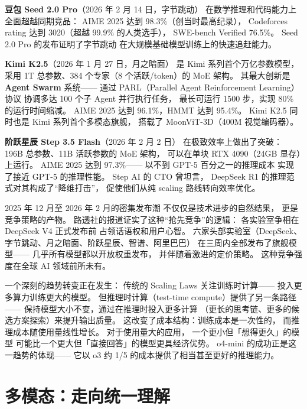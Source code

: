 \textbf{豆包 Seed 2.0 Pro}（2026 年 2 月 14 日，字节跳动）
在数学推理和代码能力上全面超越同期竞品：
AIME 2025 达到 98.3\%（创当时最高纪录），
Codeforces rating 达到 3020（超越 99.9\% 的人类选手），
SWE-bench Verified 76.5\%。
Seed 2.0 Pro 的发布证明了字节跳动
在大规模基础模型训练上的快速追赶能力。

\textbf{Kimi K2.5}（2026 年 1 月 27 日，月之暗面）
是 Kimi 系列首个万亿参数模型，
采用 1T 总参数、384 个专家（8 个活跃/token）的 MoE 架构。
其最大创新是 \textbf{Agent Swarm} 系统——
通过 PARL（Parallel Agent Reinforcement Learning）协议
协调多达 100 个子 Agent 并行执行任务，
最长可运行 1500 步，实现 80\% 的运行时间缩减。
AIME 2025 达到 96.1\%，HMMT 达到 95.4\%。
Kimi K2.5 同时也是 Kimi 系列首个多模态旗舰，
搭载了 MoonViT-3D（400M 视觉编码器）。

\textbf{阶跃星辰 Step 3.5 Flash}（2026 年 2 月 2 日）
在极致效率上做出了突破：
196B 总参数、11B 活跃参数的 MoE 架构，
可以在单块 RTX 4090（24GB 显存）上运行。
AIME 2025 达到 97.3\%——
以不到 GPT-5 百分之一的推理成本
实现了接近 GPT-5 的推理性能。
Step AI 的 CTO 曾坦言，
DeepSeek R1 的推理范式对其构成了``降维打击''，
促使他们从纯 scaling 路线转向效率优化。

\begin{corebox}[2026 年春季模型发布潮的竞争动态]
2025 年 12 月至 2026 年 2 月的密集发布潮
不仅仅是技术进步的自然结果，
更是竞争策略的产物。
路透社的报道证实了这种``抢先竞争''的逻辑：
各实验室争相在 DeepSeek V4 正式发布前
占领话语权和用户心智。
六家头部实验室（DeepSeek、字节跳动、月之暗面、阶跃星辰、智谱、阿里巴巴）
在三周内全部发布了旗舰模型——
几乎所有模型都以开放权重发布，
并伴随着激进的定价策略。
这种竞争强度在全球 AI 领域前所未有。
\end{corebox}

\begin{whybox}
一个深刻的趋势转变正在发生：
传统的 Scaling Laws 关注训练时计算——
投入更多算力训练更大的模型。
但推理时计算（test-time compute）提供了另一条路径——
保持模型大小不变，通过在推理时投入更多计算
（更长的思考链、更多的候选方案探索）来提升输出质量。
这改变了成本结构：训练成本是一次性的，
而推理成本随使用量线性增长。
对于使用量大的应用，
一个更小但「想得更久」的模型
可能比一个更大但「直接回答」的模型更具经济优势。
o4-mini 的成功正是这一趋势的体现——
它以 o3 约 1/5 的成本提供了相当甚至更好的推理能力。
\end{whybox}

\section{多模态：走向统一理解}

